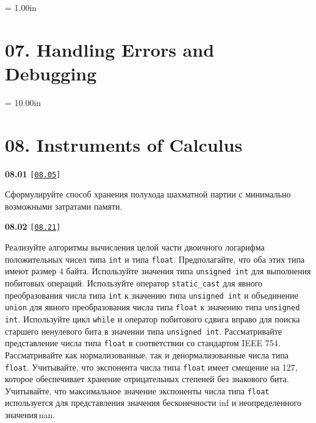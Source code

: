 \documentclass[a4paper,12pt]{article}
\begin{document}
\newpage\thispagestyle{empty}\pdfpageheight = 1.00in\enlargethispage{100in}

\section{07. Handling Errors and Debugging}



\newpage\thispagestyle{empty}\pdfpageheight = 10.00in\enlargethispage{100in}

\section{08. Instruments of Calculus}

{\large \textbf{08.01} \texttt{[\href{https://github.com/i-s-m-mipt/Education/blob/master/projects/examples/source/08.05.cpp}{\texttt{08.05}}]}}

\bigskip

Сформулируйте способ хранения полухода шахматной партии с минимально возможными затратами памяти.

\bigskip

{\large \textbf{08.02} \texttt{[\href{https://github.com/i-s-m-mipt/Education/blob/master/projects/examples/source/08.21.cpp}{\texttt{08.21}}]}}

\bigskip

Реализуйте алгоритмы вычисления целой части двоичного логарифма положительных чисел типа \lstinline{int} и типа \lstinline{float}. Предполагайте, что оба этих типа имеют размер 4 байта. Используйте значения типа \lstinline{unsigned int} для выполнения побитовых операций. Используйте оператор \lstinline{static_cast} для явного преобразования числа типа \lstinline{int} к значению типа \lstinline{unsigned int} и объединение \lstinline{union} для явного преобразования числа типа \lstinline{float} к значению типа \lstinline{unsigned int}. Используйте цикл \lstinline{while} и оператор побитового сдвига вправо для поиска старшего ненулевого бита в значении типа \lstinline{unsigned int}. Рассматривайте представление числа типа \lstinline{float} в соответствии со стандартом IEEE 754. Рассматривайте как нормализованные, так и денормализованные числа типа \lstinline{float}. Учитывайте, что экспонента числа типа \lstinline{float} имеет смещение на 127, которое обеспечивает хранение отрицательных степеней без знакового бита. Учитывайте, что максимальное значение экспоненты числа типа \lstinline{float} используется для представления значения бесконечности inf и неопределенного значения\,nan.
\end{document}

